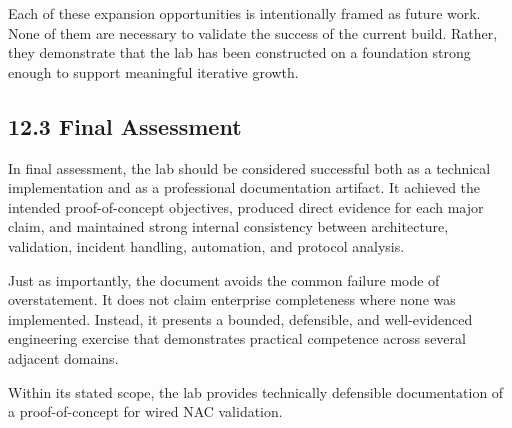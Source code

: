 \documentclass[11pt]{article}
\begin{document}
Each of these expansion opportunities is intentionally framed as future work. None of them are necessary to validate the success of the current build. Rather, they demonstrate that the lab has been constructed on a foundation strong enough to support meaningful iterative growth.


\subsection{12.3 Final Assessment}
\label{sec:final-assessment}

In final assessment, the lab should be considered successful both as a technical implementation and as a professional documentation artifact. It achieved the intended proof-of-concept objectives, produced direct evidence for each major claim, and maintained strong internal consistency between architecture, validation, incident handling, automation, and protocol analysis.

Just as importantly, the document avoids the common failure mode of overstatement. It does not claim enterprise completeness where none was implemented. Instead, it presents a bounded, defensible, and well-evidenced engineering exercise that demonstrates practical competence across several adjacent domains.

Within its stated scope, the lab provides technically defensible documentation of a proof-of-concept for wired NAC validation.

\end{document}
